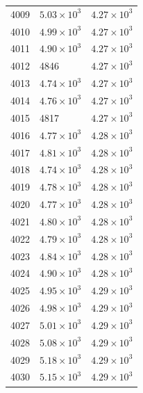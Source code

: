 \begin{table}[H]
\begin{tabular}{lll}
4009 & $\displaystyle 5.03 \times 10^{3}$ & $\displaystyle 4.27 \times 10^{3}$ \\
4010 & $\displaystyle 4.99 \times 10^{3}$ & $\displaystyle 4.27 \times 10^{3}$ \\
4011 & $\displaystyle 4.90 \times 10^{3}$ & $\displaystyle 4.27 \times 10^{3}$ \\
4012 & 4846 & $\displaystyle 4.27 \times 10^{3}$ \\
4013 & $\displaystyle 4.74 \times 10^{3}$ & $\displaystyle 4.27 \times 10^{3}$ \\
4014 & $\displaystyle 4.76 \times 10^{3}$ & $\displaystyle 4.27 \times 10^{3}$ \\
4015 & 4817 & $\displaystyle 4.27 \times 10^{3}$ \\
4016 & $\displaystyle 4.77 \times 10^{3}$ & $\displaystyle 4.28 \times 10^{3}$ \\
4017 & $\displaystyle 4.81 \times 10^{3}$ & $\displaystyle 4.28 \times 10^{3}$ \\
4018 & $\displaystyle 4.74 \times 10^{3}$ & $\displaystyle 4.28 \times 10^{3}$ \\
4019 & $\displaystyle 4.78 \times 10^{3}$ & $\displaystyle 4.28 \times 10^{3}$ \\
4020 & $\displaystyle 4.77 \times 10^{3}$ & $\displaystyle 4.28 \times 10^{3}$ \\
4021 & $\displaystyle 4.80 \times 10^{3}$ & $\displaystyle 4.28 \times 10^{3}$ \\
4022 & $\displaystyle 4.79 \times 10^{3}$ & $\displaystyle 4.28 \times 10^{3}$ \\
4023 & $\displaystyle 4.84 \times 10^{3}$ & $\displaystyle 4.28 \times 10^{3}$ \\
4024 & $\displaystyle 4.90 \times 10^{3}$ & $\displaystyle 4.28 \times 10^{3}$ \\
4025 & $\displaystyle 4.95 \times 10^{3}$ & $\displaystyle 4.29 \times 10^{3}$ \\
4026 & $\displaystyle 4.98 \times 10^{3}$ & $\displaystyle 4.29 \times 10^{3}$ \\
4027 & $\displaystyle 5.01 \times 10^{3}$ & $\displaystyle 4.29 \times 10^{3}$ \\
4028 & $\displaystyle 5.08 \times 10^{3}$ & $\displaystyle 4.29 \times 10^{3}$ \\
4029 & $\displaystyle 5.18 \times 10^{3}$ & $\displaystyle 4.29 \times 10^{3}$ \\
4030 & $\displaystyle 5.15 \times 10^{3}$ & $\displaystyle 4.29 \times 10^{3}$ \\

\end{tabular}
\end{table}

